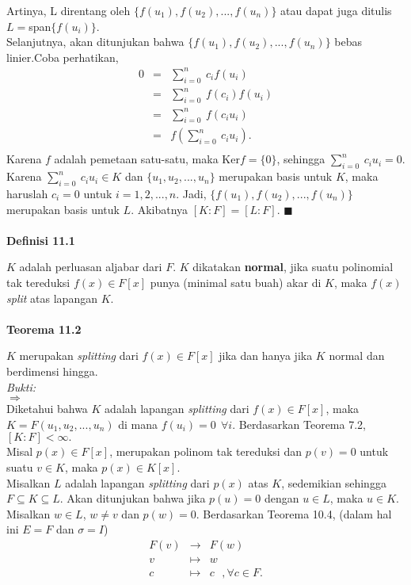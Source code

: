 	Artinya, L direntang oleh $\{f(u_1),f(u_2),...,f(u_n)\}$ atau dapat juga ditulis $L=$span$\{f(u_i)\}$. %
\\	Selanjutnya, akan ditunjukan bahwa $\{f(u_1),f(u_2),...,f(u_n)\}$ bebas linier.Coba perhatikan,
	$$\begin{array}{rcl}
	0&=&\sum^{n}_{i=0} \ c_if(u_i)\\
	&=& \sum^{n}_{i=0} \ f(c_i)f(u_i)\\
	&=& \sum^{n}_{i=0} \ f(c_iu_i)\\
	&=& f(\sum^{n}_{i=0} \ c_iu_i).\\
	\end{array}$$	
	Karena $f$ adalah pemetaan satu-satu, maka Ker$f=\{0\}$, sehingga $\sum^{n}_{i=0} \ c_iu_i = 0$. Karena $\sum^{n}_{i=0} \ c_iu_i\in K$ dan $\{u_1,u_2,...,u_n\}$ merupakan basis untuk $K$, maka haruslah $c_i=0$ untuk $i=1,2,...,n$. Jadi,
	$\{f(u_1),f(u_2),...,f(u_n)\}$ merupakan basis untuk $L$. Akibatnya $[K:F]=[L:F]$. $\blacksquare$
\\
\\
	\textbf{Definisi 11.1}
\par 	$K$ adalah perluasan aljabar dari $F$. $K$ dikatakan \textbf{normal}, jika suatu polinomial tak tereduksi $f(x)\in F[x]$ punya (minimal satu buah) akar di $K$, maka $f(x)$ \textit{split} atas lapangan $K.$
\\
\\
	\textbf{Teorema 11.2}
\par 	$K$ merupakan \textit{splitting} dari $f(x)\in F[x]$ jika dan hanya jika $K$ normal dan berdimensi hingga.
\\
	\textit{Bukti:}
\\	$\Rightarrow$
\\	Diketahui bahwa $K$ adalah lapangan \textit{splitting} dari $f(x) \in F[x]$, maka $K=F(u_1,u_2,...,u_n)$ di mana $f(u_i)=0~~\forall i$. Berdasarkan Teorema 7.2, $[K:F]< \infty.$
\\	Misal $p(x)\in F[x]$, merupakan polinom tak tereduksi dan $p(v)=0$ untuk suatu $v\in K$, maka $p(x)\in K[x].$
\\	Misalkan $L$ adalah lapangan \textit{splitting} dari $p(x)$ atas $K$, sedemikian sehingga $F\subseteq K \subseteq L.$ Akan ditunjukan bahwa jika $p(u)=0$ dengan $u\in L$, maka $u\in K.$
\\	Misalkan $w\in L$, $w \ne v$ dan $p(w)=0$. Berdasarkan Teorema 10.4, (dalam hal ini $E=F$ dan $\sigma = I$)
	$$\begin{array}{rcl}
	F(v) &\longrightarrow& F(w)\\
	v &\mapsto& w\\
	c &\mapsto& c~~~,\forall c\in F.
	 \end{array}$$
